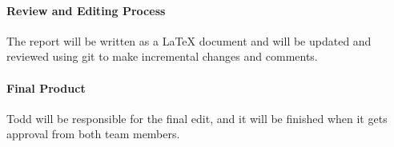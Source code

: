 \documentclass[10pt,a4paper]{report}
\begin{document}
\paragraph{Review and Editing Process}
The report will be written as a LaTeX document and will be updated and reviewed
using git to make incremental changes and comments.
\paragraph{Final Product}
Todd will be responsible for the final edit, and it will be finished when it
gets approval from both team members.
\end{document}
